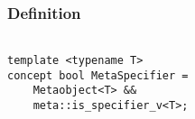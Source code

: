 
\subsubsection{Definition}

\begin{verbatim}

template <typename T>
concept bool MetaSpecifier =
	Metaobject<T> &&
	meta::is_specifier_v<T>;

\end{verbatim}
